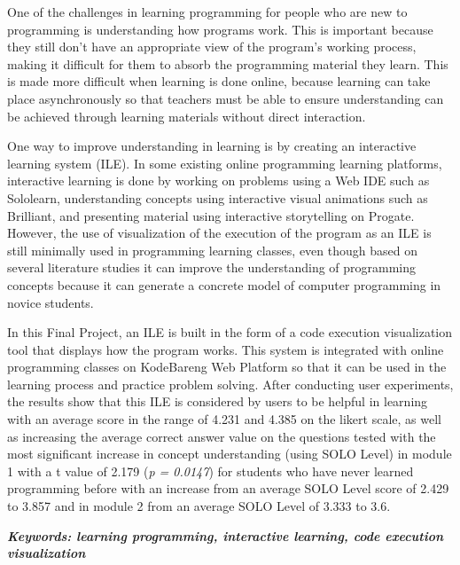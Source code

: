 \begin{singlespace}
  One of the challenges in learning programming for people who are new to programming is understanding how programs work. This is important because they still don't have an appropriate view of the program's working process, making it difficult for them to absorb the programming material they learn. This is made more difficult when learning is done online, because learning can take place asynchronously so that teachers must be able to ensure understanding can be achieved through learning materials without direct interaction.

  One way to improve understanding in learning is by creating an interactive learning system (ILE). In some existing online programming learning platforms, interactive learning is done by working on problems using a Web IDE such as Sololearn, understanding concepts using interactive visual animations such as Brilliant, and presenting material using interactive storytelling on Progate. However, the use of visualization of the execution of the program as an ILE is still minimally used in programming learning classes, even though based on several literature studies it can improve the understanding of programming concepts because it can generate a concrete model of computer programming in novice students.

  In this Final Project, an ILE is built in the form of a code execution visualization tool that displays how the program works. This system is integrated with online programming classes on KodeBareng Web Platform so that it can be used in the learning process and practice problem solving. After conducting user experiments, the results show that this ILE is considered by users to be helpful in learning with an average score in the range of 4.231 and 4.385 on the likert scale, as well as increasing the average correct answer value on the questions tested with the most significant increase in concept understanding (using SOLO Level) in module 1 with a t value of 2.179 (\textit{p = 0.0147}) for students who have never learned programming before with an increase from an average SOLO Level score of 2.429 to 3.857 and in module 2 from an average SOLO Level of 3.333 to 3.6.

  \textbf{\textit{Keywords: learning programming, interactive learning, code execution visualization}}
\end{singlespace}

\clearpage
